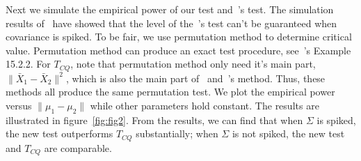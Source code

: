 \documentclass[review]{elsarticle}
\theoremstyle{plain}
\theoremstyle{definition}
\theoremstyle{remark}
\begin{document}
Next we simulate the empirical power of our test and~\cite{Chen2010A}'s test.
The simulation results of~\cite{Ma2015A} have showed that the level of the~\cite{Chen2010A}'s test can't be guaranteed when covariance is spiked.
To be fair, we use permutation method to determine critical value.
Permutation method can produce an exact test procedure, see~\cite{Lehmann}'s Example 15.2.2.\@
For $T_{CQ}$, note that permutation method only need it's main part, $\|\bar{X}_1-\bar{X}_2\|^2$, which is also the main part of~\cite{Bai1996Efiect} and~\cite{Ma2015A}'s method.
Thus, these methods all produce the same permutation test.
We plot the empirical power versus $\|\mu_1-\mu_2\|$ while other parameters hold constant.
The results are illustrated in figure~\ref{fig:fig2}.
From the results, we can find that when $\Sigma$ is spiked, the new test outperforms $T_{CQ}$ substantially; when $\Sigma$ is not spiked, the new test and $T_{CQ}$ are comparable.
\end{document}
